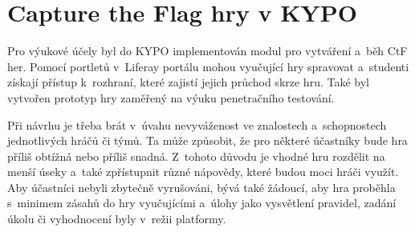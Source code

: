 \documentclass[
  digital, %
  oneside, %
  table,   %
  nolof,     %
  nolot,     %
]{fithesis3}
\begin{document}
\section{Capture the Flag hry v KYPO} \label{ctfGamesKYPO}
Pro výukové účely byl do KYPO implementován modul pro vytváření a~běh CtF her. Pomocí portletů v~Liferay portálu mohou vyučující hry spravovat a~studenti získají přístup k~rozhraní, které zajistí jejich průchod skrze hru. Také byl vytvořen prototyp hry zaměřený na výuku penetračního testování.\par
Při návrhu je třeba brát v~úvahu nevyváženost ve znalostech a~schopnostech jednotlivých hráčů či týmů. Ta může způsobit, že pro některé účastníky bude hra příliš obtížná nebo příliš snadná. Z~tohoto důvodu je vhodné hru rozdělit na menší úseky a~také zpřístupnit různé nápovědy, které budou moci hráči využít. Aby účastníci nebyli zbytečně vyrušováni, bývá také žádoucí, aby hra proběhla s~minimem zásahů do hry vyučujícími a~úlohy jako vysvětlení pravidel, zadání úkolu či vyhodnocení byly v~režii platformy. \cite{ctfDesign} 
\end{document}
